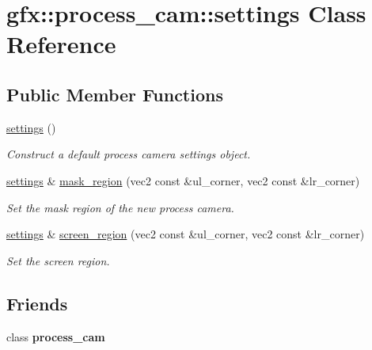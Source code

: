 \hypertarget{classgfx_1_1process__cam_1_1settings}{\section{gfx\-:\-:process\-\_\-cam\-:\-:settings Class Reference}
\label{classgfx_1_1process__cam_1_1settings}
}
\subsection*{Public Member Functions}
\begin{DoxyCompactItemize}
\item 
\hyperlink{classgfx_1_1process__cam_1_1settings_a811c1d1bd88146d93185197957540244}{settings} ()
\begin{DoxyCompactList}\small\item\em Construct a default process camera settings object. \end{DoxyCompactList}\item 
\hyperlink{classgfx_1_1process__cam_1_1settings}{settings} \& \hyperlink{classgfx_1_1process__cam_1_1settings_aec566507e75ef3e69c368a1f3a0ec800}{mask\-\_\-region} (vec2 const \&ul\-\_\-corner, vec2 const \&lr\-\_\-corner)
\begin{DoxyCompactList}\small\item\em Set the mask region of the new process camera. \end{DoxyCompactList}\item 
\hyperlink{classgfx_1_1process__cam_1_1settings}{settings} \& \hyperlink{classgfx_1_1process__cam_1_1settings_aef2d6a81c5ecd6be87d3568c8dcdcccd}{screen\-\_\-region} (vec2 const \&ul\-\_\-corner, vec2 const \&lr\-\_\-corner)
\begin{DoxyCompactList}\small\item\em Set the screen region. \end{DoxyCompactList}\end{DoxyCompactItemize}
\subsection*{Friends}
\begin{DoxyCompactItemize}
\item 
\hypertarget{classgfx_1_1process__cam_1_1settings_adf8f45badd88763a081b2d503006ef5f}{class {\bfseries process\-\_\-cam}}\label{classgfx_1_1process__cam_1_1settings_adf8f45badd88763a081b2d503006ef5f}

\end{DoxyCompactItemize}


